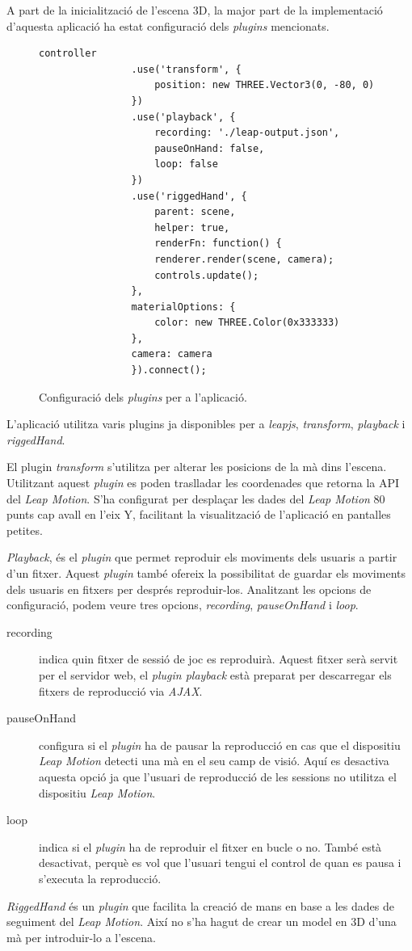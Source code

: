 \documentclass[12pt,a4paper,catalan]{article}
\begin{document}
	A part de la inicialització de l'escena 3D, la major part de la implementació d'aquesta aplicació ha estat configuració dels \textit{plugins} mencionats.
	\begin{figure}[H]
		\begin{lstlisting}[gobble=12, tabsize=4]
			controller
				.use('transform', {
					position: new THREE.Vector3(0, -80, 0)
				})
				.use('playback', {
					recording: './leap-output.json',
					pauseOnHand: false,
					loop: false
				})
				.use('riggedHand', {
					parent: scene,
					helper: true,
					renderFn: function() {
					renderer.render(scene, camera);
					controls.update();
				},
				materialOptions: {
					color: new THREE.Color(0x333333)
				},
				camera: camera
				}).connect();
		\end{lstlisting}
		\caption{Configuració dels \textit{plugins} per a l'aplicació.}
		\label{fig:monitoring-web}
	\end{figure}
	L'aplicació utilitza varis plugins ja disponibles per a \textit{leapjs}, \textit{transform}, \textit{playback} i \textit{riggedHand}.
	
	El plugin \textit{transform} s'utilitza per alterar les posicions de la mà dins l'escena. Utilitzant aquest \textit{plugin} es poden traslladar les coordenades que retorna la API del \textit{Leap Motion}. S'ha configurat per desplaçar les dades del \textit{Leap Motion} 80 punts cap avall en l'eix Y, facilitant la visualització de l'aplicació en pantalles petites.
	
	\textit{Playback}, és el \textit{plugin} que permet reproduir els moviments dels usuaris a partir d'un fitxer. Aquest \textit{plugin} també ofereix la possibilitat de guardar els moviments dels usuaris en fitxers per després reproduir-los.
	Analitzant les opcions de configuració, podem veure tres opcions, \textit{recording}, \textit{pauseOnHand} i \textit{loop}.
	\begin{description}
		\item[recording] indica quin fitxer de sessió de joc es reproduirà. Aquest fitxer serà servit per el servidor web, el \textit{plugin playback} està preparat per descarregar els fitxers de reproducció via \textit{AJAX}.
		\item[pauseOnHand] configura si el \textit{plugin} ha de pausar la reproducció en cas que el dispositiu \textit{Leap Motion} detecti una mà en el seu camp de visió. Aquí es desactiva aquesta opció ja que l'usuari de reproducció de les sessions no utilitza el dispositiu \textit{Leap Motion}.
		\item[loop] indica si el \textit{plugin} ha de reproduir el fitxer en bucle o no. També està desactivat, perquè es vol que l'usuari tengui el control de quan es pausa i s'executa la reproducció.
	\end{description}
	\textit{RiggedHand} és un \textit{plugin} que facilita la creació de mans en base a les dades de seguiment del \textit{Leap Motion}. Així no s'ha hagut de crear un model en 3D d'una mà per introduir-lo a l'escena.
	
\end{document}
